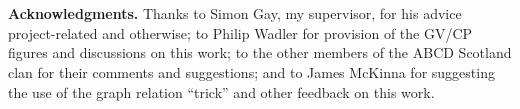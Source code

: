 \\~\\
{\bf Acknowledgments.} Thanks to Simon Gay, my supervisor, for his advice
project-related and otherwise; to Philip Wadler for provision of the GV/CP
figures and discussions on this work; to the other members of the ABCD
Scotland clan for their comments and suggestions; and to James McKinna for
suggesting the use of the graph relation ``trick'' and other feedback on this
work.
